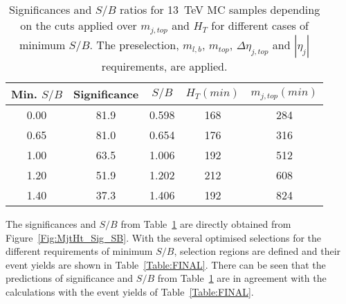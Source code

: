 \begin{table} [htb]
\begin{center}
\begin{tabular}{|c|c|c|c|c|} 
\hline
Min. $S/B$ & Significance & $S/B$ & $H_{T}(min)$ & $m_{j,top}(min)$ \\ \hline
0.00 & 81.9 & 0.598 & 168 & 284 \\
0.65 & 81.0 & 0.654 & 176 & 316 \\
1.00 & 63.5 & 1.006 & 192 & 512 \\
1.20 & 51.9 & 1.202 & 212 & 608 \\
1.40 & 37.3 & 1.406 & 192 & 824 \\ \hline
\end{tabular}
\caption{Significances and $S/B$ ratios for 13~TeV MC samples depending on the cuts applied over $m_{j,top}$ and $H_{T}$ for different cases of minimum $S/B$. The preselection, $m_{l,b}$, $m_{top}$, $\Delta\eta_{j, top}$ and $|\eta_j|$ requirements, are applied.} 
\label{Table:MjtHtMisc}
\end{center}
\end{table}

The significances and $S/B$ from Table~\ref{Table:MjtHtMisc} are directly obtained from Figure~\ref{Fig:MjtHt_Sig_SB}. With the several optimised selections for the different requirements of minimum $S/B$, selection regions are defined and their event yields are shown in Table~\ref{Table:FINAL}. There can be seen that the predictions of significance and $S/B$ from Table~\ref{Table:MjtHtMisc} are in agreement with the calculations with the event yields of Table~\ref{Table:FINAL}. 

